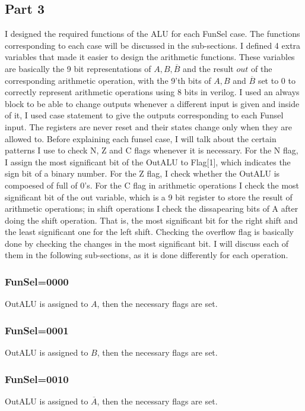 \documentclass[pdftex,12pt,a4paper]{article}
\begin{document}
\subsection{Part 3}
I designed the required functions of the ALU for each FunSel case. The functions corresponding to each case will be discussed in the
sub-sections. I defined 4 extra variables that made it easier to design the arithmetic functions. These variables are basically the 9 
bit representations of $A, B, \overline{B}$ and the result $out$ of the corresponding arithmetic operation, with the 9'th bits of 
$A, B$ and $\overline{B}$ set to 0 to correctly represent arithmetic  operations using 8 bits in verilog. 
\newline
I used an always block to be able to change outputs whenever a different input is given and inside of it, I used case statement to
give the outputs corresponding to each Funsel input. The registers are never reset and their states change only when they are allowed
to. 
\newline
Before explaining each funsel case, I will talk about the certain patterns I use to check N, Z and C flags whenever it is necessary. 
For the N flag, I assign the most significant bit of the OutALU to Flag[1], which indicates the sign bit of a binary number. 
For the Z flag, I check whether the OutALU is compoesed of full of 0's. For the C flag in arithmetic operations I check the most 
significant bit of the out variable, which is a 9 bit register to store the result of arithmetic operations; in shift operations I 
check the dissapearing bits of A after doing the shift operation. That is, the most significant bit for the right shift and the 
least significant one for the left shift. 
Checking the overflow flag is basically done by checking the changes in the most significant bit. I will discuss each of them
in the following sub-sections, as it is done differently for each operation. 

\subsubsection{FunSel=0000}
OutALU is assigned to $A$, then the necessary flags are set.
\subsubsection{FunSel=0001}
OutALU is assigned to $B$, then the necessary flags are set.
\subsubsection{FunSel=0010}
OutALU is assigned to $\overline{A}$, then the necessary flags are set.
\end{document}
